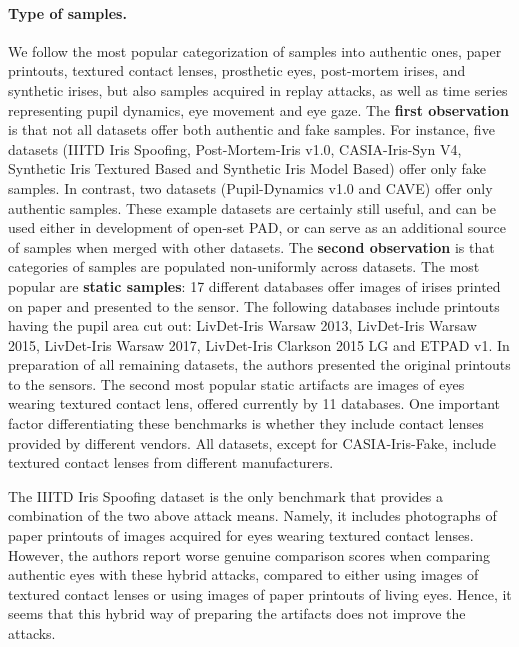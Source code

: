 \documentclass[format=acmsmall, review=false, timestamp=false]{acmart}
\begin{document}
\paragraph{Type of samples.} We follow the most popular categorization of samples into authentic ones, paper printouts, textured contact lenses, prosthetic eyes, post-mortem irises, {and} synthetic irises, but also samples acquired in replay attacks, as well as time series representing pupil dynamics, eye movement and eye gaze. The {\bf first observation} is that not all datasets offer both {authentic} and {fake} samples. For instance, five datasets ({\sf IIITD Iris Spoofing}, {\sf Post-Mortem-Iris v1.0}, {\sf CASIA-Iris-Syn V4}, {\sf Synthetic Iris Textured Based} and {\sf Synthetic Iris Model Based}) offer only {fake} samples. In contrast, two datasets ({\sf Pupil-Dynamics} v1.0 and {\sf CAVE}) offer only {authentic} samples. These example datasets are certainly still useful, and can be used either in development of open-set PAD, or can serve as an additional source of samples when merged with other datasets. The {\bf second observation} is that categories of samples are populated non-uniformly across datasets. The most popular are {\bf static samples}: 17 different databases offer images of irises printed on paper and presented to the sensor. The following databases include printouts having the pupil area cut out: {\sf LivDet-Iris Warsaw 2013}, {\sf LivDet-Iris Warsaw 2015}, {\sf LivDet-Iris Warsaw 2017}, {\sf LivDet-Iris Clarkson 2015 LG} and {\sf ETPAD v1}. In preparation of all remaining datasets, the authors presented the original printouts to the sensors. The second most popular static artifacts are images of eyes wearing textured contact lens, offered currently by 11 databases. One important factor differentiating these benchmarks is whether they include contact lenses provided by different vendors. All datasets, except for {\sf CASIA-Iris-Fake}, include textured contact lenses from different manufacturers. 

{The} {\sf IIITD Iris Spoofing} dataset is the only benchmark that provides a combination of the two above attack means. Namely, it includes photographs of paper printouts of images acquired for eyes wearing textured contact lenses. However, the authors report worse genuine comparison scores when comparing authentic eyes with these hybrid attacks, compared to either using images of textured contact lenses or using images of paper printouts of living eyes. Hence, it seems that this hybrid way of preparing the artifacts does not improve the attacks.
\end{document}
